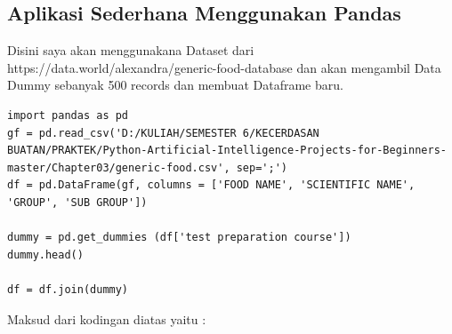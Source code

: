\subsection{Aplikasi Sederhana Menggunakan Pandas}
Disini saya akan menggunakana Dataset dari https://data.world/alexandra/generic-food-database dan akan mengambil Data Dummy sebanyak 500 records dan membuat Dataframe baru.
\begin{verbatim}
import pandas as pd
gf = pd.read_csv('D:/KULIAH/SEMESTER 6/KECERDASAN BUATAN/PRAKTEK/Python-Artificial-Intelligence-Projects-for-Beginners-master/Chapter03/generic-food.csv', sep=';')
df = pd.DataFrame(gf, columns = ['FOOD NAME', 'SCIENTIFIC NAME', 'GROUP', 'SUB GROUP'])

dummy = pd.get_dummies (df['test preparation course'])
dummy.head()
 
df = df.join(dummy)
\end{verbatim}
Maksud dari kodingan diatas yaitu :
